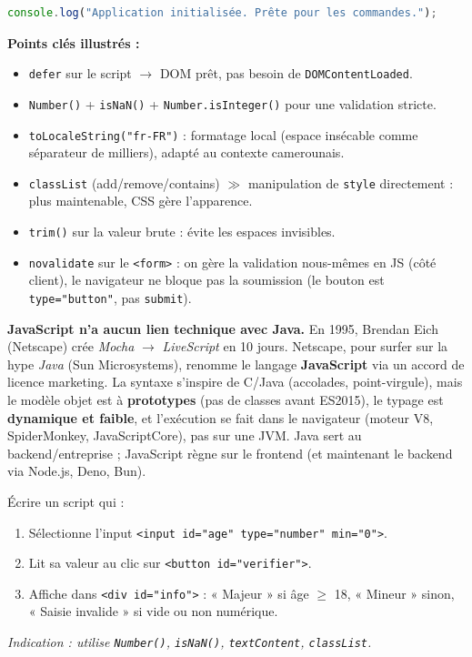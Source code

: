 \documentclass[11pt]{article}
\begin{document}
\begin{exoresolu}
\begin{enumerate}
\begin{lstlisting}[language=JavaScript]
console.log("Application initialisée. Prête pour les commandes.");
\end{lstlisting}
\end{enumerate}

\textbf{Points clés illustrés :}
\begin{itemize}
    \item \texttt{defer} sur le script $\rightarrow$ DOM prêt, pas besoin de \texttt{DOMContentLoaded}.
    \item \texttt{Number()} + \texttt{isNaN()} + \texttt{Number.isInteger()} pour une validation stricte.
    \item \texttt{toLocaleString("fr-FR")} : formatage local (espace insécable comme séparateur de milliers), adapté au contexte camerounais.
    \item \texttt{classList} (add/remove/contains) $\gg$ manipulation de \texttt{style} directement : plus maintenable, CSS gère l'apparence.
    \item \texttt{trim()} sur la valeur brute : évite les espaces invisibles.
    \item \texttt{novalidate} sur le \texttt{<form>} : on gère la validation nous-mêmes en JS (côté client), le navigateur ne bloque pas la soumission (le bouton est \texttt{type="button"}, pas \texttt{submit}).
\end{itemize}
\end{exoresolu}

\begin{savaistu}
\textbf{JavaScript n'a aucun lien technique avec Java.} En 1995, Brendan Eich (Netscape) crée \emph{Mocha} $\rightarrow$ \emph{LiveScript} en 10 jours. Netscape, pour surfer sur la hype \emph{Java} (Sun Microsystems), renomme le langage \textbf{JavaScript} via un accord de licence marketing. La syntaxe s'inspire de C/Java (accolades, point-virgule), mais le modèle objet est à \textbf{prototypes} (pas de classes avant ES2015), le typage est \textbf{dynamique et faible}, et l'exécution se fait dans le navigateur (moteur V8, SpiderMonkey, JavaScriptCore), pas sur une JVM. Java sert au backend/entreprise ; JavaScript règne sur le frontend (et maintenant le backend via Node.js, Deno, Bun).
\end{savaistu}

\begin{exercice}
Écrire un script qui :
\begin{enumerate}
    \item Sélectionne l'input \texttt{<input id="age" type="number" min="0">}.
    \item Lit sa valeur au clic sur \texttt{<button id="verifier">}.
    \item Affiche dans \texttt{<div id="info">} : « Majeur » si âge $\ge$ 18, « Mineur » sinon, « Saisie invalide » si vide ou non numérique.
\end{enumerate}
\textit{Indication : utilise \texttt{Number()}, \texttt{isNaN()}, \texttt{textContent}, \texttt{classList}.}
\end{exercice}
\end{document}
